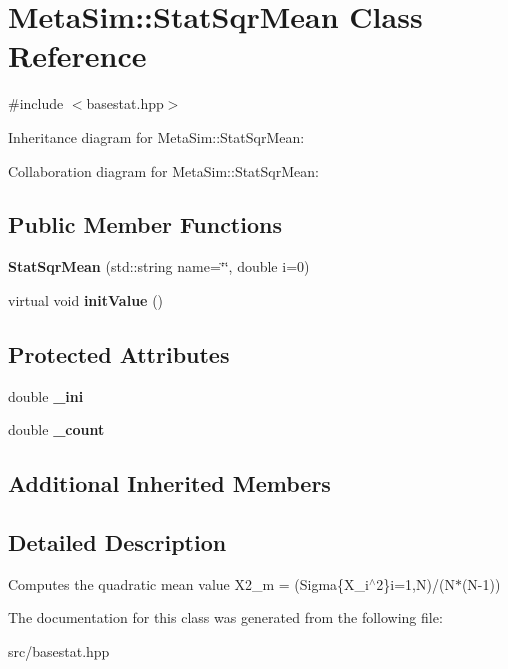 \hypertarget{classMetaSim_1_1StatSqrMean}{}\section{Meta\+Sim\+:\+:Stat\+Sqr\+Mean Class Reference}
\label{classMetaSim_1_1StatSqrMean}


{\ttfamily \#include $<$basestat.\+hpp$>$}



Inheritance diagram for Meta\+Sim\+:\+:Stat\+Sqr\+Mean\+:


Collaboration diagram for Meta\+Sim\+:\+:Stat\+Sqr\+Mean\+:
\subsection*{Public Member Functions}
\begin{DoxyCompactItemize}
\item 
{\bfseries Stat\+Sqr\+Mean} (std\+::string name=\char`\"{}\char`\"{}, double i=0)
\item 
virtual void {\bfseries init\+Value} ()
\end{DoxyCompactItemize}
\subsection*{Protected Attributes}
\begin{DoxyCompactItemize}
\item 
double {\bfseries \+\_\+ini}
\item 
double {\bfseries \+\_\+count}
\end{DoxyCompactItemize}
\subsection*{Additional Inherited Members}


\subsection{Detailed Description}
Computes the quadratic mean value X2\+\_\+m = (Sigma\{X\+\_\+i$^\wedge$2\}i=1,N)/(N$\ast$(N-\/1)) 

The documentation for this class was generated from the following file\+:\begin{DoxyCompactItemize}
\item 
src/basestat.\+hpp\end{DoxyCompactItemize}
